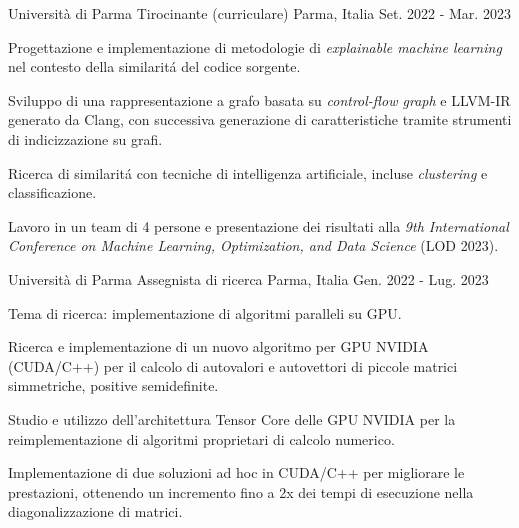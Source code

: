 \begin{cventries}
\cventry
    {Università di Parma} %
    {Tirocinante (curriculare)} %
    {Parma, Italia} %
    {Set. 2022 - Mar. 2023} %
    {
        \begin{cvitems} %
            \item {Progettazione e implementazione di metodologie di \textit{explainable machine learning}
            nel contesto della similaritá del codice sorgente.}
            \item {Sviluppo di una rappresentazione a grafo basata su \textit{control-flow graph} e
            LLVM-IR generato da Clang, con successiva generazione di caratteristiche tramite
            strumenti di indicizzazione su grafi.}
            \item {Ricerca di similaritá con tecniche di intelligenza artificiale,
            incluse \textit{clustering} e classificazione.}
            \item {Lavoro in un team di 4 persone e presentazione dei risultati alla \textit{9th International
            Conference on Machine Learning, Optimization, and Data Science }(LOD 2023).}
        \end{cvitems}
    }

\cventry
    {Università di Parma} %
    {Assegnista di ricerca} %
    {Parma, Italia} %
    {Gen. 2022 - Lug. 2023} %
    {
        \begin{cvitems} %
            \item {Tema di ricerca: implementazione di algoritmi paralleli su GPU.}
            \item {Ricerca e implementazione di un nuovo algoritmo per GPU NVIDIA (CUDA/C++)
            per il calcolo di autovalori e autovettori di piccole matrici simmetriche,
            positive semidefinite.}
            \item {Studio e utilizzo dell'architettura Tensor Core delle GPU NVIDIA per la
            reimplementazione di algoritmi proprietari di calcolo numerico.}
            \item {Implementazione di due soluzioni ad hoc in CUDA/C++ per migliorare le prestazioni,
            ottenendo un incremento fino a 2x dei tempi di esecuzione nella diagonalizzazione di matrici.}
        \end{cvitems}
    }


\end{cventries}
